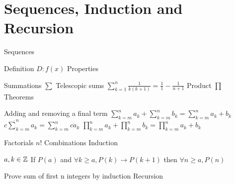 \section{Sequences, Induction and Recursion}
\begin{itemize}
\bulletitem Sequences
\begin{itemize}
\bulletitem Definition \( D:f(x) \)
\bulletitem Properties
\end{itemize}
\bulletitem Summations \( \sum \)
\bulletitem Telescopic sums \( \sum_{k=1}^{n} \frac{1}{k(k+1)} = \frac{1}{1}-\frac{1}{n+1} \)
\bulletitem Product \( \prod \)
\bulletitem Theorems
\begin{itemize}
\bulletitem Adding and removing a final term
\bulletitem \( \sum_{k=m}^{n} a_k + \sum_{k=m}^{n} b_k = \sum_{k=m}^{n} a_k + b_k \)
\bulletitem \( c \dot \sum_{k=m}^{n} a_k = \sum_{k=m}^{n} c \dot a_k \)
\bulletitem \( \prod_{k=m}^{n} a_k + \prod_{k=m}^{n} b_k = \prod_{k=m}^{n} a_k + b_k \)
\end{itemize}
\bulletitem Factorials \( n! \)
\bulletitem Combinations 
\bulletitem Induction
\begin{itemize}
\bulletitem \( a,k \in \mathbb{Z} \)
\bulletitem If \( P(a) \)
\bulletitem and \( \forall k \geq a, P(k) \rightarrow P(k+1) \)
\bulletitem then \( \forall n \geq a, P(n) \)
\end{itemize}
\bulletitem Prove sum of first n integers by induction
\bulletitem Recursion
\end{itemize}